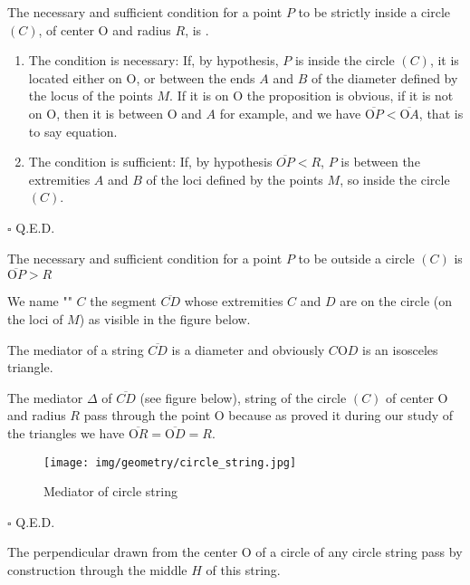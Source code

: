 	\begin{theorem}
	The necessary and sufficient condition for a point $P$ to be strictly inside a circle $(C)$, of center O and radius $R$, is .
	\end{theorem}
	\begin{dem}
	\begin{enumerate}
		\item The condition is necessary: If, by hypothesis, $P$ is inside the circle $(C)$, it is located either on O, or between the ends $A$ and $B$ of the diameter defined by the locus of the points $M$. If it is on O the proposition is obvious, if it is not on O, then it is between O and $A$ for example, and we have $\overline{\text{O}P}<\overline{\text{O}A}$, that is to say equation.

		\item The condition is sufficient: If, by hypothesis $\overline{OP}<R$, $P$ is between the extremities $A$ and $B$ of the loci defined by the points $M$, so inside the circle $(C)$.
	\end{enumerate}
	\begin{flushright}
		$\square$  Q.E.D.
	\end{flushright}
	\end{dem}
	\begin{corollary}
	The necessary and sufficient condition for a point $P$ to be outside a circle $(C)$ is $\overline{\text{O}P}>R$
	\end{corollary}
	
	We name "" $C$ the segment  $\overline{CD}$ whose extremities $C$ and $D$ are on the circle (on the loci of $M$) as visible in the figure below.

	\begin{theorem}
	The mediator of a string $\overline{CD}$ is a diameter and obviously $C\text{O}D$ is an isosceles triangle.
	\end{theorem}
	\begin{dem}
	The mediator $\Delta$ of $\overline{CD}$ (see figure below), string of the circle $(C)$ of center O and radius $R$ pass through the point O because as proved it during our study of the triangles we have $\overline{\text{O}R}=\overline{\text{O}D}=R$.
	\begin{figure}[H]
		\centering
		\texttt{[image: img/geometry/circle\_string.jpg]}
		\caption[]{Mediator of circle string}
	\end{figure}
	\begin{flushright}
		$\square$  Q.E.D.
	\end{flushright}
	\end{dem}
	\begin{corollary}
	The perpendicular drawn from the center O of a circle of any circle string pass by construction through the middle $H$ of this string.
	\end{corollary}
	
